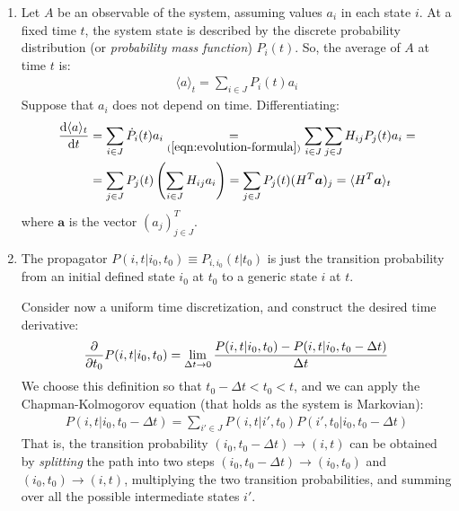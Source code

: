 \documentclass[../template.tex]{subfiles}
\begin{document}
\begin{exo}
    \begin{enumerate}
        \item Let $A$ be an observable of the system, assuming values $a_i$ in each state $i$.
        At a fixed time $t$, the system state is described by the discrete probability distribution (or \textit{probability mass function}) $P_i(t)$. So, the average of $A$ at time $t$ is:
        \begin{align*}
            \langle a \rangle_t = \sum_{i \in J} P_i(t) a_i
        \end{align*}
        Suppose that $a_i$ does not depend on time. Differentiating:
        \begin{align*}
            \dv{\langle a \rangle_t}{t} &= \sum_{i \in J} \dot{P}_i(t) a_i \underset{(\ref{eqn:evolution-formula})}{=}  \sum_{i \in J} \sum_{j \in J} H_{ij} P_j(t) a_i =\\&= \sum_{j \in J} P_j(t) \left(\sum_{i \in J} H_{ij} a_i\right) = \sum_{j \in J} P_j (t)(H^T \bm{a})_j = \langle H^T \bm{a} \rangle_t
        \end{align*}
        where $\bm{a}$ is the vector  $(a_j)_{j \in J}^T$.
        \item The propagator $P(i,t|i_0,t_0) \equiv P_{i,i_0}(t|t_0)$ is just the transition probability from an initial defined state $i_0$ at $t_0$ to a generic state $i$ at $t$.
        
        Consider now a uniform time discretization, and construct the desired time derivative:
        \begin{align*}
            \pdv{t_0} P(i,t|i_0, t_0) = \lim_{\Delta t \to 0} \frac{P(i,t|i_0,t_0) - P(i,t|i_0, t_0 - \Delta t)}{\Delta t} 
        \end{align*}
        We choose this definition so that $t_0 - \Delta t < t_0 < t$, and we can apply the Chapman-Kolmogorov equation (that holds as the system is Markovian):
        \begin{align} \label{eqn:esck1}
            P(i,t|i_0, t_0 - \Delta t) = \sum_{i' \in J} P(i,t|i',t_0) P(i',t_0|i_0,t_0 - \Delta t)
        \end{align}
        That is, the transition probability $(i_0,t_0 - \Delta t) \to (i,t)$ can be obtained by \textit{splitting} the path into two steps $(i_0,t_0 - \Delta t) \to (i_0,t_0)$ and $(i_0,t_0) \to (i, t)$, multiplying the two transition probabilities, and summing over all the possible intermediate states $i'$.
        

\end{enumerate}
\end{exo}
\end{document}
